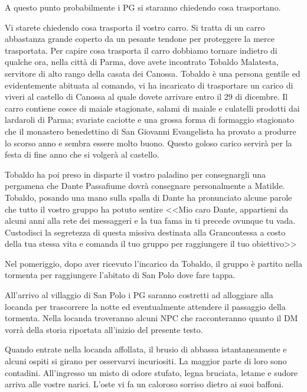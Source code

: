 \documentclass[letterpaper,twocolumn,openany,nodeprecatedcode]{dndbook}
\begin{document}
A questo punto probabilmente i PG si staranno chiedendo cosa trasportano.

\begin{DndReadAloud}
Vi starete chiedendo cosa trasporta il vostro carro. Si tratta di un carro abbastanza grande coperto da un pesante tendone per proteggere la merce trasportata. Per capire cosa trasporta il carro dobbiamo tornare indietro di qualche ora, nella città di Parma, dove avete incontrato Tobaldo Malatesta, servitore di alto rango della casata dei Canossa. Tobaldo è una persona gentile ed evidentemente abituata al comando, vi ha incaricato di trasportare un carico di viveri al castello di Canossa al quale dovete arrivare entro il 29 di dicembre. Il carro contiene cosce di maiale stagionate, salami di maiale e culatelli prodotti dai lardaroli di Parma; svariate caciotte e una grossa forma di formaggio stagionato che il monastero benedettino di San Giovanni Evangelista ha provato a produrre lo scorso anno e sembra essere molto buono. Questo goloso carico servirà per la festa di fine anno che si volgerà al castello.

Tobaldo ha poi preso in disparte il vostro paladino per consegnargli una pergamena che Dante Passafiume dovrà consegnare personalmente a Matilde. Tobaldo, posando una mano sulla spalla di Dante ha pronunciato alcune parole che tutto il vostro gruppo ha potuto sentire <<Mio caro Dante, appartieni da alcuni anni alla rete dei messaggeri e la tua fama in ti precede ovunque tu vada. Custodisci la segretezza di questa missiva destinata alla Grancontessa a costo della tua stessa vita e comanda il tuo gruppo per raggiungere il tuo obiettivo>>
\end{DndReadAloud}

Nel pomeriggio, dopo aver ricevuto l'incarico da Tobaldo, il gruppo è partito nella tormenta per raggiungere l'abitato di San Polo dove fare tappa.


All'arrivo al villaggio di San Polo i PG saranno costretti ad alloggiare alla locanda per trascorrere la notte ed eventualmente attendere il passaggio della tormenta. Nella locanda troveranno alcuni NPC che racconteranno quanto il DM vorrà della storia riportata all'inizio del presente testo.

\begin{DndReadAloud}
Quando entrate nella locanda affollata, il brusio di abbassa istantaneamente e alcuni ospiti si girano per osservarvi incuriositi. La maggior parte di loro sono contadini. All'ingresso un misto di odore stufato, legna bruciata, letame e sudore arriva alle vostre narici. L'oste vi fa un caloroso sorriso dietro ai suoi baffoni.
\end{DndReadAloud}
\end{document}
